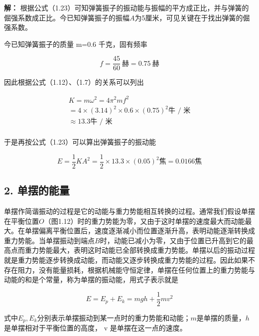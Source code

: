 \textbf{解：}
根据公式（1.23）可知弹簧振子的振动能与振幅的平方成正比，并与弹簧的倔强系数成正比。今已知弹簧振子的振幅\(A\)为5厘米，可见关键在于找出弹簧的倔强系数。

今已知弹簧振子的质量 m=0.6 千克，固有频率

\[
f=\frac{45}{60}\ \text{赫}=0.75\ \text{赫}
\]

因此根据公式（1.12）、（1.7）的关系可以列出

\[
\begin{array}{l} K = m \omega^ {2} = 4 \pi^ {2} m f ^ {2} \\ = 4 \times (3.14) ^ {2} \times 0.6 \times (0.75) ^ {2} \text{牛 / 米} \\ \approx 13.3 \text{牛 / 米} \\ \end{array}
\]

于是再按公式（1.23）可以算出弹簧振子的振动能

\[
E = \frac {1}{2} K A ^ {2} = \frac {1}{2} \times 13.3 \times (0.05) ^ {2} \text{焦} = 0.0166 \text{焦}
\]

\subsection{2. 单摆的能量}\label{ux5355ux6446ux7684ux80fdux91cf}

单摆作简谐振动的过程是它的动能与重力势能相互转换的过程。通常我们假设单摆在平衡位置\(O\)（图1.12）时的重力势能为零，又由于这时单摆的速度最大而动能最大。在单摆偏离平衡位置后，速度逐渐减小而位置逐渐升高，表明动能逐渐转换成重力势能。当单摆振动到端点\(B\)时，动能已减小为零，又由于位置已升高到它的最高点而重力势能最大，表明这时动能已全部转换成重力势能。单摆以后的振动过程就是重力势能逐步转换成动能，而动能又逐步转换成重力势能的过程。因此如果不存在阻力，没有能量损耗，根据机械能守恒定律，单摆在任何位置上的重力势能与动能的和是个常量，称为单摆的振动能，用式子表示就是

\[
E = E _ {p} + E _ {k} = m g h + \frac {1}{2} m v ^ {2}
\]

式中\(E_{p}, E_{k}\)分别表示单摆振动到某一点时的重力势能和动能；\(m\)是单摆的质量，\(h\)是单摆相对于平衡位置的高度，
v 是单摆在这一点的速度。

